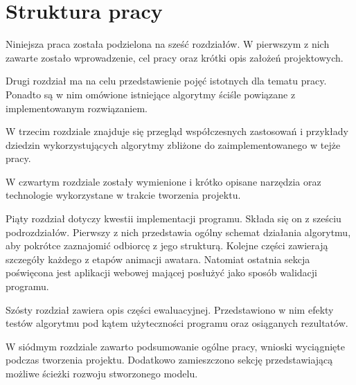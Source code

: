 
\section{Struktura pracy}
\label{sec:strukturaPracy}
Niniejsza praca została podzielona na sześć rozdziałów. W pierwszym z nich zawarte zostało wprowadzenie, cel pracy oraz krótki opis założeń projektowych.

Drugi rozdział ma na celu przedstawienie pojęć istotnych dla tematu pracy. Ponadto są w nim omówione istniejące algorytmy ściśle powiązane z implementowanym rozwiązaniem. 

W trzecim rozdziale znajduje się przegląd współczesnych zastosowań i przykłady dziedzin wykorzystujących algorytmy zbliżone do zaimplementowanego w tejże pracy. 

W czwartym rozdziale zostały wymienione i krótko opisane narzędzia oraz technologie wykorzystane w trakcie tworzenia projektu.

Piąty rozdział dotyczy kwestii implementacji programu. Składa się on z sześciu podrozdziałów. Pierwszy z nich przedstawia ogólny schemat działania algorytmu, aby pokrótce zaznajomić odbiorcę z jego strukturą. Kolejne części zawierają szczegóły każdego z etapów animacji awatara. Natomiat ostatnia sekcja poświęcona jest aplikacji webowej mającej posłużyć jako sposób walidacji programu.

Szósty rozdział zawiera opis części ewaluacyjnej. Przedstawiono w nim efekty testów algorytmu pod kątem użyteczności programu oraz osiąganych rezultatów.

W siódmym rozdziale zawarto podsumowanie ogólne pracy, wnioski wyciągnięte podczas tworzenia projektu. Dodatkowo zamieszczono sekcję przedstawiającą możliwe ścieżki rozwoju stworzonego modelu.













